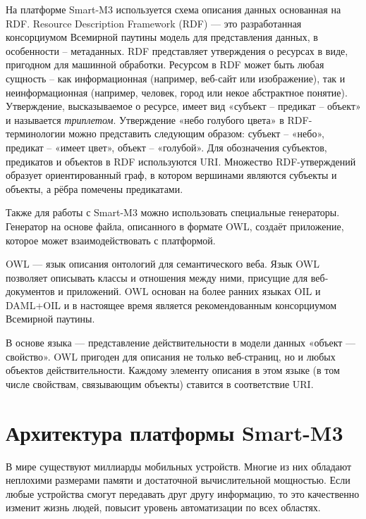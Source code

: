 На платформе Smart-M3 используется схема описания данных основанная на RDF.
Resource Description Framework (RDF) --- это разработанная консорциумом Всемирной паутины модель для представления данных, в особенности -- метаданных. RDF представляет утверждения о ресурсах в виде, пригодном для машинной обработки. Ресурсом в RDF может быть любая сущность -- как информационная (например, веб-сайт или изображение), так и неинформационная (например, человек, город или некое абстрактное понятие). Утверждение, высказываемое о ресурсе, имеет вид «субъект -- предикат -- объект» и называется {\it триплетом}. Утверждение «небо голубого цвета» в RDF-терминологии можно представить следующим образом: субъект -- «небо», предикат -- «имеет цвет», объект -- «голубой». Для обозначения субъектов, предикатов и объектов в RDF используются URI. Множество RDF-утверждений образует ориентированный граф, в котором вершинами являются субъекты и объекты, а рёбра помечены предикатами.

Также для работы с Smart-M3 можно использовать специальные генераторы. Генератор на основе файла, описанного в формате OWL, создаёт приложение, которое может взаимодействовать с платформой.

OWL --- язык описания онтологий для семантического веба. Язык OWL позволяет описывать классы и отношения между ними, присущие для веб-документов и приложений. OWL основан на более ранних языках OIL и DAML+OIL и в настоящее время является рекомендованным консорциумом Всемирной паутины.

В основе языка --- представление действительности в модели данных «объект — свойство». OWL пригоден для описания не только веб-страниц, но и любых объектов действительности. Каждому элементу описания в этом языке (в том числе свойствам, связывающим объекты) ставится в соответствие URI.

\section{Архитектура платформы Smart-M3}
В мире существуют миллиарды мобильных устройств. Многие из них обладают неплохими размерами памяти и достаточной вычислительной мощностью. Если любые устройства смогут передавать друг другу информацию, то это качественно изменит жизнь людей, повысит уровень автоматизации по всех областях.

